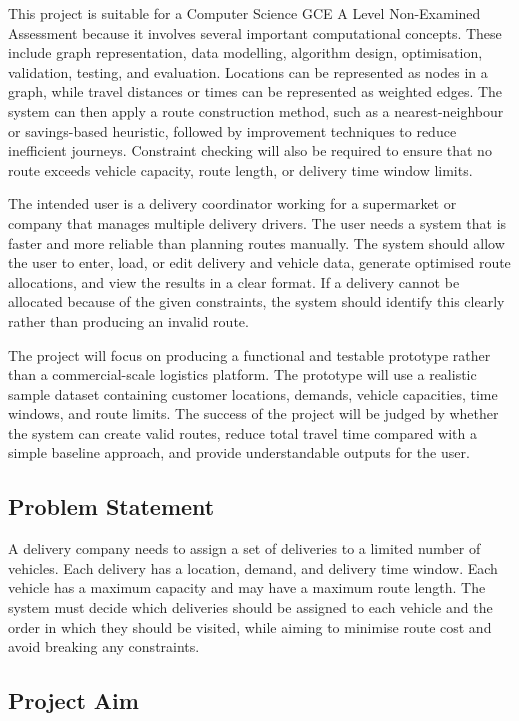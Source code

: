 \documentclass[11pt]{article}
\begin{document}
This project is suitable for a Computer Science GCE A Level Non-Examined Assessment because it involves several important computational concepts. These include graph representation, data modelling, algorithm design, optimisation, validation, testing, and evaluation. Locations can be represented as nodes in a graph, while travel distances or times can be represented as weighted edges. The system can then apply a route construction method, such as a nearest-neighbour or savings-based heuristic, followed by improvement techniques to reduce inefficient journeys. Constraint checking will also be required to ensure that no route exceeds vehicle capacity, route length, or delivery time window limits.

The intended user is a delivery coordinator working for a supermarket or company that manages multiple delivery drivers. The user needs a system that is faster and more reliable than planning routes manually. The system should allow the user to enter, load, or edit delivery and vehicle data, generate optimised route allocations, and view the results in a clear format. If a delivery cannot be allocated because of the given constraints, the system should identify this clearly rather than producing an invalid route.

The project will focus on producing a functional and testable prototype rather than a commercial-scale logistics platform. The prototype will use a realistic sample dataset containing customer locations, demands, vehicle capacities, time windows, and route limits. The success of the project will be judged by whether the system can create valid routes, reduce total travel time compared with a simple baseline approach, and provide understandable outputs for the user.

\subsection{Problem Statement}

A delivery company needs to assign a set of deliveries to a limited number of vehicles. Each delivery has a location, demand, and delivery time window. Each vehicle has a maximum capacity and may have a maximum route length. The system must decide which deliveries should be assigned to each vehicle and the order in which they should be visited, while aiming to minimise route cost and avoid breaking any constraints.

\subsection{Project Aim}
\end{document}
